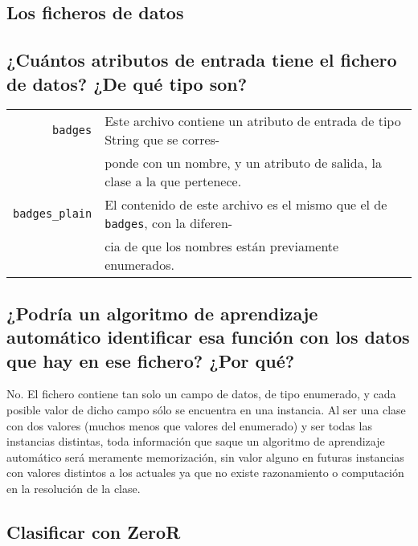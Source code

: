 \documentclass[12pt]{article}
\begin{document}
\tableofcontents

\newpage

\begin{center}
\section{Los ficheros de datos}
\end{center}

\subsection*{\small ¿Cuántos atributos de entrada tiene el fichero de datos?
¿De qué tipo son?}

\begin{tabular}{rl}
  \texttt{badges} & Este archivo contiene un atributo de entrada de tipo String
  que se corres- \\ &ponde con un nombre, y un atributo de salida, la clase a la
  que pertenece.\\
  \texttt{badges\_plain} & El contenido de este archivo es el mismo que el de
  \texttt{badges}, con la diferen- \\ &cia de que los nombres están previamente
  enumerados.
\end{tabular}

\subsection*{\small ¿Podría un algoritmo de aprendizaje automático identificar
esa función con los datos que hay en ese fichero? ¿Por qué?}

No. El fichero contiene tan solo un campo de datos, de tipo enumerado, y cada
posible valor de dicho campo sólo se encuentra en una instancia. Al ser una
clase con dos valores (muchos menos que valores del enumerado) y ser todas las
instancias distintas, toda información que saque un algoritmo de aprendizaje
automático será meramente memorización, sin valor alguno en futuras instancias
con valores distintos a los actuales ya que no existe razonamiento o
computación en la resolución de la clase.

\newpage

\begin{center}
\section{Clasificar con ZeroR}
\end{center}
\end{document}
